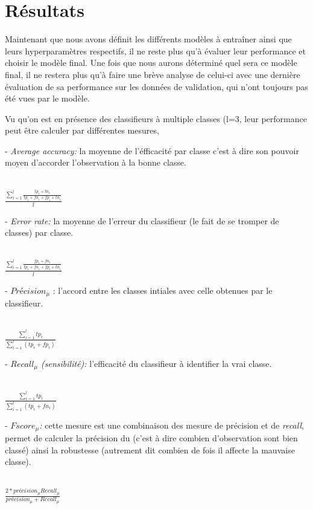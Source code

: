 \section{Résultats}
Maintenant que nous avons définit les différents modèles à entraîner ainsi que leurs hyperparamètres respectifs, il ne reste plus qu'à évaluer leur performance et choisir le modèle final. Une fois que nous aurons déterminé quel sera ce modèle final, il ne restera plus qu'à faire une brève analyse de celui-ci avec une dernière évaluation de sa performance sur les données de validation, qui n'ont toujours pas été vues par le modèle.  


Vu qu'on est en présence des classifieurs à multiple classes (l=3, leur performance peut être calculer par différentes mesures,

- \textit{Average accuracy:} la moyenne de l'éfficacité par classe c'est à dire son pouvoir moyen d'accorder l'observation à la bonne classe. \\\\
\begin{center}
	$\frac{\sum_{i=1}^{l} \frac{tp_i +tn_i}{tp_i + fn_i + fp_i+ tn_i}}{l}$
\end{center}

- \textit{Error rate:} la moyenne de l'erreur du classifieur (le fait de se tromper de classes) par classe.\\ \\
\begin{center}
	$\frac{\sum_{i=1}^{l} \frac{fp_i +fn_i}{tp_i + fn_i + fp_i+ tn_i}}{l}$
\end{center}

- $Précision_{\mu}$ : l'accord entre les classes intiales avec celle obtenues par le classifieur. \\\\
\begin{center}
	$\frac{\sum_{i=1}^{l} tp_i}{\sum_{i=1}^{l} (tp_i + fp_i)}$
\end{center}

- \textit{$Recall_{\mu}$ (sensibilité):} l'efficacité du classifieur à identifier la vrai classe.\\\\
\begin{center}
	$\frac{\sum_{i=1}^{l} tp_i}{\sum_{i=1}^{l} (tp_i + fn_i)}$
\end{center}

- \textit{$F score_{\mu}$:} cette mesure est une combinaison des mesure de précision et de \textit{recall}, permet de calculer la précision du (c'est à dire combien d'observation sont bien classé) ainsi la robustesse (autrement dit combien de fois il affecte la mauvaise classe).\\\\
\begin{center}
	$\frac{2 * précision_{\mu} Recall_{\mu}}{précision_{\mu} + Recall_{\mu}}$
\end{center}

